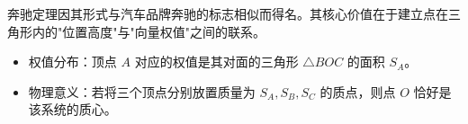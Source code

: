 \begin{explanationbox}
奔驰定理因其形式与汽车品牌奔驰的标志相似而得名。其核心价值在于建立点在三角形内的"位置高度"与"向量权值"之间的联系。
\begin{itemize}
    \item 权值分布：顶点 $A$ 对应的权值是其对面的三角形 $\triangle BOC$ 的面积 $S_A$。
    \item 物理意义：若将三个顶点分别放置质量为 $S_A, S_B, S_C$ 的质点，则点 $O$ 恰好是该系统的质心。
\end{itemize}
\end{explanationbox}
